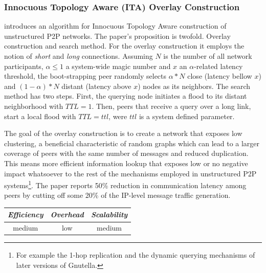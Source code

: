 \subsubsection{Innocuous Topology Aware (ITA) Overlay Construction}
\cite{PRFM2009} introduces an algorithm for Innocuous Topology Aware
construction of unstructured P2P networks. The paper's proposition is twofold.
Overlay construction and search method. For the overlay construction it employs
the notion of \emph{short} and \emph{long} connections. Assuming $N$ is the
number of all network participants, $\alpha \leq 1 $ a system-wide magic number
and $x$ an $\alpha$-related latency threshold, the boot-strapping peer randomly
selects $\alpha \ast N$ close (latency bellow $x$) and
$\left( 1 - \alpha \right) \ast N$ distant (latency above $x$) nodes as its
neighbors. The search method has two steps. First, the querying node initiates a
flood to its distant neighborhood with $TTL = 1$. Then, peers that receive a
query over a long link, start a local flood with $TTL = ttl$, were $ttl$ is a
system defined parameter.

The goal of the overlay construction is to create a network that exposes low
clustering, a beneficial characteristic of random graphs which can lead to a
larger coverage of peers with the same number of messages and reduced
duplication. This means more efficient information lookup that exposes low or no
negative impact whatsoever to the rest of the mechanisms employed in
unstructured P2P systems\footnote{For example the 1-hop replication and the
dynamic querying mechanisms of later versions of Gnutella.}. The paper reports
50\% reduction in communication latency among peers by cutting off some 20\% of
the IP-level message traffic generation.

\begin{center}
\begin{tabular}{ccc}
\emph{Efficiency} & \emph{Overhead} & \emph{Scalability} \\
\hline
medium &
low &
medium
\end{tabular}
\end{center}


